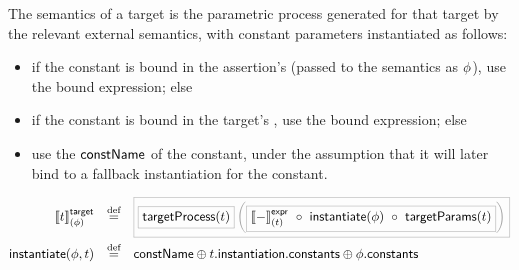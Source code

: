 \begin{definition}[\mtarget]

The semantics of a target is the parametric process generated for that
target by the relevant external semantics, with constant parameters instantiated
as follows:

\begin{itemize}
\item
	if the constant is bound in the assertion's \mtargetinstantiation{}
	(passed to the semantics as \(\phi\)), use the bound expression; else
\item
	if the constant is bound in the target's \mtargetinstantiation, use
	the bound expression; else
\item
	use the \(\mathsf{constName}\) of the constant, under the assumption
	that it will later bind to a fallback instantiation for the constant.
\end{itemize}
%
\begin{align*}
	\targetsema{\atarget}{\aninst}
\quad\defeq\quad&
\tlang{
	\olang{\funcname{targetProcess}(\atarget)}
	\left(
		\olang{\exprsema{-}{\atarget}\ \circ\ \funcname{instantiate}(\aninst)\ \circ\ \funcname{targetParams}(\atarget)}
	\right)
}
\\
	\funcname{instantiate}(\aninst, \atarget)
\quad\defeq\quad&
	\funcname{constName}
	\oplus
	\field{\field{\atarget}{instantiation}}{constants}
	\oplus
	\field{\aninst}{constants}
\end{align*}
\end{definition}


